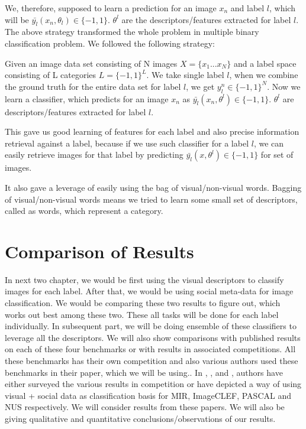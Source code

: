 We, therefore, supposed to learn a prediction for an image $x_n$ and label $l$, which will be $\bar{y_l} (x_n,\theta_l)\in\{-1,1\}$.  $\theta^l$ are the descriptors/features extracted for label $l$. The above strategy transformed the whole problem in multiple binary classification problem. We followed the following strategy:

  Given an image data set consisting of N images $X = \{x_1 ...x_N\}$ and a label space consisting of L categories $L = \{-1, 1\}^L$. We take single label  $l$,  when we combine the ground truth for the entire data set for label $l$, we get $y^n_l \in \{-1,1\}^N$. Now we learn a classifier, which predicts for an image $x_n$ as $\bar{y_l} (x_n,\theta^l)\in\{-1,1\} $. $\theta^l$ are  descriptors/features extracted for label $l$.

	 This gave us good learning of features for each label and also precise information retrieval against a label, because if we use such classifier for a label $l$, we can easily retrieve images for that label by predicting $\bar{y_l} (x,\theta^l)\in\{-1,1\}$ for set of images.
	
	 It also gave a leverage of easily using the bag of visual/non-visual words. Bagging of visual/non-visual words means we tried to learn some small set of descriptors, called as words, which represent a category.


\section{Comparison of Results}

In next two chapter, we would be first using the visual descriptors to classify images for each label. After that, we would be using social meta-data for image classification. We  would be comparing these two results to figure out, which works out best among these two. These all tasks will be done for each label individually.
In subsequent part, we will be doing ensemble of these classifiers to leverage all the descriptors. We will also show comparisons with published results on each of these four benchmarks or with results in associated competitions. All these benchmarks has their own competition and also various authors used these benchmarks in their paper, which we will be using.. In \citet*{MIRresults}, \citet*{CLEF} ,\citet*{PASCAL} and  \citet*{NUS}, authors have either surveyed the various results in competition or have depicted a way of using visual + social data as classification basis for MIR, ImageCLEF, PASCAL and NUS respectively. We will consider results from these papers. We will also be giving qualitative and quantitative conclusions/observations  of our results.

